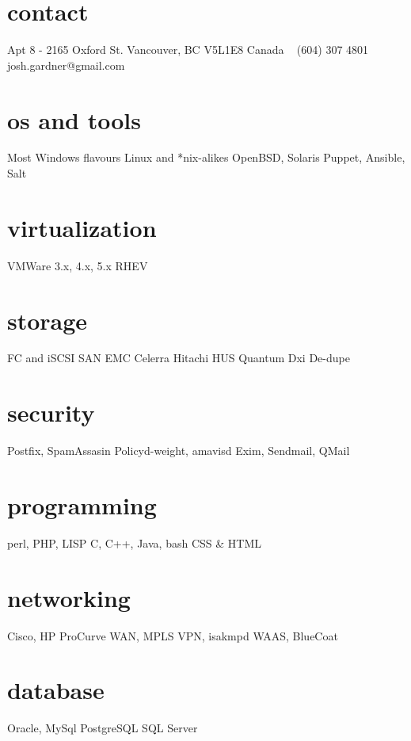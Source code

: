 \documentclass[]{friggeri-cv} %
\begin{document}


\begin{aside} %
\section{contact}
Apt 8 - 2165 Oxford St.
Vancouver, BC V5L1E8
Canada
~
(604) 307 4801
~
josh.gardner@gmail.com
\section{os and tools}
Most Windows flavours
Linux and *nix-alikes
OpenBSD, Solaris
Puppet, Ansible, Salt
\section{virtualization}
VMWare 3.x, 4.x, 5.x
RHEV
\section{storage}
FC and iSCSI SAN
EMC Celerra
Hitachi HUS
Quantum Dxi
De-dupe
\section{security}
Postfix, SpamAssasin
Policyd-weight, amavisd
Exim, Sendmail, QMail
\section{programming}
perl, PHP, LISP
C, C++, Java, bash
CSS \& HTML
\section{networking}
Cisco, HP ProCurve
WAN, MPLS
VPN, isakmpd
WAAS, BlueCoat
\section{database}
Oracle, MySql
PostgreSQL
SQL Server
\end{aside}



\end{document}
